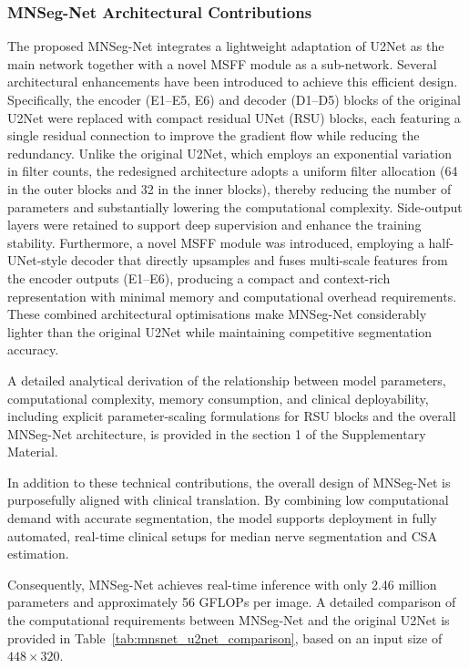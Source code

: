 \subsubsection{MNSeg-Net Architectural Contributions}
\noindent
The proposed MNSeg-Net integrates a lightweight adaptation of U2Net as the main network together with a novel MSFF module as a sub-network. Several architectural enhancements have been introduced to achieve this efficient design. Specifically, the encoder (E1–E5, E6) and decoder (D1–D5) blocks of the original U2Net were replaced with compact residual UNet (RSU) blocks, each featuring a single residual connection to improve the gradient flow while reducing the redundancy. Unlike the original U2Net, which employs an exponential variation in filter counts, the redesigned architecture adopts a uniform filter allocation (64 in the outer blocks and 32 in the inner blocks), thereby reducing the number of parameters and substantially lowering the computational complexity. Side-output layers were retained to support deep supervision and enhance the training stability. Furthermore, a novel MSFF module was introduced, employing a half-UNet-style decoder that directly upsamples and fuses multi-scale features from the encoder outputs (E1–E6), producing a compact and context-rich representation with minimal memory and computational overhead requirements. These combined architectural optimisations make MNSeg-Net considerably lighter than the original U2Net while maintaining competitive segmentation accuracy.

A detailed analytical derivation of the relationship between model parameters, computational complexity, memory consumption, and clinical deployability, including explicit parameter-scaling formulations for RSU blocks and the overall MNSeg-Net architecture, is provided in the section 1 of the Supplementary Material.

In addition to these technical contributions, the overall design of MNSeg-Net is purposefully aligned with clinical translation. By combining low computational demand with accurate segmentation, the model supports deployment in fully automated, real-time clinical setups for median nerve segmentation and CSA estimation.


Consequently, MNSeg-Net achieves real-time inference with only 2.46 million parameters and approximately 56 GFLOPs per image. A detailed comparison of the computational requirements between MNSeg-Net and the original U2Net is provided in Table~\ref{tab:mnsnet_u2net_comparison}, based on an input size of $448 \times 320$.



